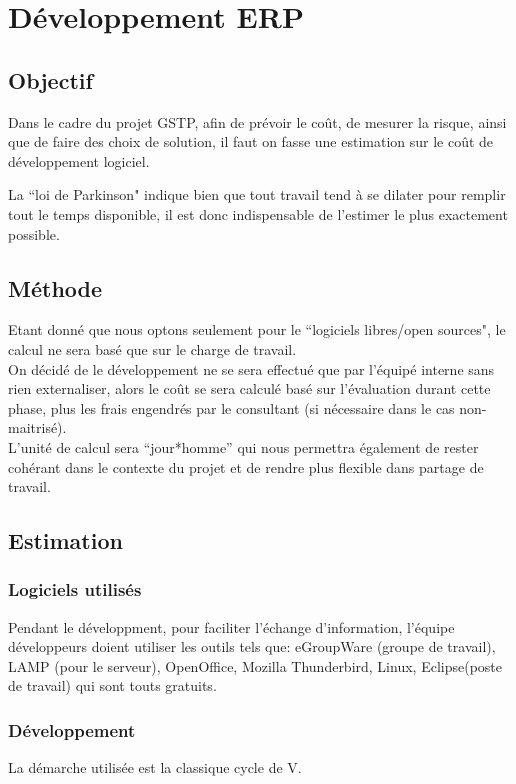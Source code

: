 \section{Développement ERP}
\subsection{Objectif}
Dans le cadre du projet GSTP, afin de prévoir le coût, de mesurer la risque, ainsi que de faire des choix de solution, il faut on fasse une estimation sur le coût de développement logiciel.

La ``loi de Parkinson" indique bien que tout travail tend à
se dilater pour remplir tout le temps disponible, il est donc indispensable de l’estimer le plus exactement possible. 
 
\subsection{Méthode}

Etant donné que nous optons seulement pour le ``logiciels libres/open sources", le calcul ne sera basé que sur le charge de travail.\\

On décidé de le développement ne se sera effectué que par l’équipé interne sans rien externaliser, alors le coût se sera calculé basé sur l’évaluation durant cette phase, plus les frais engendrés par le consultant (si nécessaire dans le cas non-maitrisé). \\

L’unité de calcul sera ``jour*homme'' qui nous permettra également de rester cohérant dans le contexte du projet et de rendre plus flexible dans partage de travail.

\subsection{Estimation}
\subsubsection{Logiciels utilisés}
Pendant le développment, pour faciliter l'échange d'information, l'équipe développeurs doient utiliser les outils tels que: eGroupWare (groupe de travail), LAMP (pour le serveur), OpenOffice, Mozilla Thunderbird, Linux, Eclipse(poste de travail) qui sont touts gratuits.

\subsubsection{Développement}
La démarche utilisée est la classique cycle de V. 

